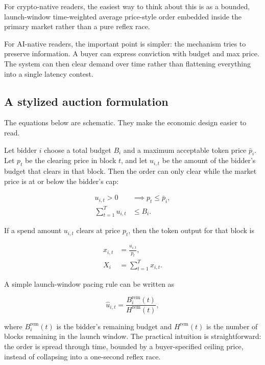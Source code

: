 \documentclass[11pt]{article}
\begin{document}
For crypto-native readers, the easiest way to think about this is as a bounded, launch-window time-weighted average price-style order embedded inside the primary market rather than a pure reflex race.

For AI-native readers, the important point is simpler: the mechanism tries to preserve information. A buyer can express conviction with budget and max price. The system can then clear demand over time rather than flattening everything into a single latency contest.

\subsection{A stylized auction formulation}

The equations below are schematic. They make the economic design easier to read.

Let bidder \(i\) choose a total budget \(B_i\) and a maximum acceptable token price \(\bar{p}_i\). Let \(p_t\) be the clearing price in block \(t\), and let \(u_{i,t}\) be the amount of the bidder's budget that clears in that block. Then the order can only clear while the market price is at or below the bidder's cap:

\begin{align}
u_{i,t} > 0 &\implies p_t \le \bar{p}_i, \\
\sum_{t=1}^{T} u_{i,t} &\le B_i.
\end{align}

If a spend amount \(u_{i,t}\) clears at price \(p_t\), then the token output for that block is

\begin{align}
x_{i,t} &= \frac{u_{i,t}}{p_t}, \\
X_i &= \sum_{t=1}^{T} x_{i,t}.
\end{align}

A simple launch-window pacing rule can be written as

\begin{equation}
\hat{u}_{i,t} = \frac{B_i^{\mathrm{rem}}(t)}{H^{\mathrm{rem}}(t)},
\end{equation}

where \(B_i^{\mathrm{rem}}(t)\) is the bidder's remaining budget and \(H^{\mathrm{rem}}(t)\) is the number of blocks remaining in the launch window. The practical intuition is straightforward: the order is spread through time, bounded by a buyer-specified ceiling price, instead of collapsing into a one-second reflex race.
\end{document}
